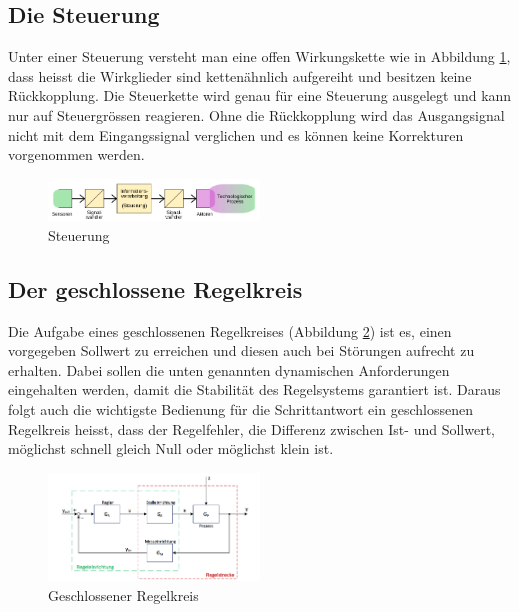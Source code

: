 \subsection{Die Steuerung}

Unter einer Steuerung  versteht man eine offen Wirkungskette  wie in Abbildung
\ref{fig:Steuerung},   dass  heisst   die  Wirkglieder   sind  ketten\"ahnlich
aufgereiht und besitzen keine R\"uckkopplung. Die Steuerkette wird genau f\"ur
eine Steuerung ausgelegt und kann  nur auf Steuergr\"ossen reagieren. Ohne die
R\"uckkopplung wird das Ausgangsignal  nicht mit dem Eingangssignal verglichen
und es k\"onnen keine Korrekturen vorgenommen werden.

\begin{figure}[!h!, width=\pagewidth]
    \centering
    \includegraphics[width=0.5\textwidth]{images/Steuerung}
    \caption{Steuerung}
    \label{fig:Steuerung}
\end{figure}


\subsection{Der geschlossene Regelkreis}
\label{subs:grundl:geschlossenerRegelkreis}
Die      Aufgabe     eines      geschlossenen     Regelkreises      (Abbildung
\ref{fig:geschlossenerRegelkreis})  ist  es,   einen  vorgegeben  Sollwert  zu
erreichen und diesen  auch bei St\"orungen aufrecht  zu erhalten. Dabei sollen
die unten  genannten dynamischen  Anforderungen eingehalten werden,  damit die
Stabilit\"at des Regelsystems garantiert ist. Daraus folgt auch die wichtigste
Bedienung f\"ur  die Schrittantwort ein geschlossenen  Regelkreis heisst, dass
der Regelfehler, die Differenz zwischen Ist- und Sollwert, m\"oglichst schnell
gleich Null oder m\"oglichst klein ist.


\begin{figure}[!h!, width=\pagewidth]
    \centering
    \includegraphics[width=0.5\textwidth]{images/geschlRegelkreis}
    \caption{Geschlossener Regelkreis}
    \label{fig:geschlossenerRegelkreis}
\end{figure}


